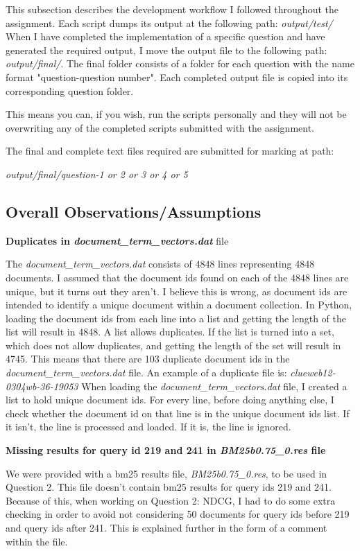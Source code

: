 \documentclass{article} %
\begin{document}
This subsection describes the development workflow I followed throughout the assignment. Each script dumps its output at the following path: \textit{output/test/} When I have completed the implementation of a specific question and have generated the required output, I move the output file to the following path: \textit{output/final/}. The final folder consists of a folder for each question with the name format "question-question number". Each completed output file is copied into its corresponding question folder.

This means you can, if you wish, run the scripts personally and they will not be overwriting any of the completed scripts submitted with the assignment.

The final and complete text files required are submitted for marking at path:

\textit{output/final/question-1 or 2 or 3 or 4 or 5}

\subsection*{Overall Observations/Assumptions}

\textbf{Duplicates in \textit{document\_term\_vectors.dat}} file

The \textit{document\_term\_vectors.dat} consists of 4848 lines representing 4848 documents. I assumed that the document ids found on each of the 4848 lines are unique, but it turns out they aren't. I believe this is wrong, as document ids are intended to identify a unique document within a document collection. In Python, loading the document ids from each line into a list and getting the length of the list will result in 4848. A list allows duplicates. If the list is turned into a set, which does not allow duplicates, and getting the length of the set will result in 4745. This means that there are 103 duplicate document ids in the \textit{document\_term\_vectors.dat} file. An example of a duplicate file is: \textit{clueweb12-0304wb-36-19053}
When loading the \textit{document\_term\_vectors.dat} file, I created a list to hold unique document ids. For every line, before doing anything else, I check whether the document id on that line is in the unique document ids list. If it isn't, the line is processed and loaded. If it is, the line is ignored.

\textbf{Missing results for query id 219 and 241 in \textit{BM25b0.75\_0.res} file}

We were provided with a bm25 results file, \textit{BM25b0.75\_0.res}, to be used in Question 2. This file doesn't contain bm25 results for query ids 219 and 241. Because of this, when working on Question 2: NDCG, I had to do some extra checking in order to avoid not considering 50 documents for query ids before 219 and query ids after 241. This is explained further in the form of a comment within the file.
\end{document}
